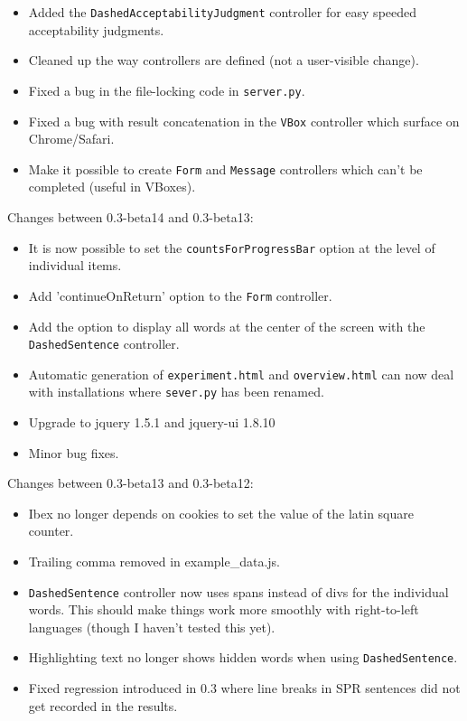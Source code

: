 \documentclass[
]{article}
\providecommand{\tightlist}{%
  \setlength{\itemsep}{0pt}\setlength{\parskip}{0pt}}
\begin{document}
\begin{itemize}
\tightlist
\item
  Added the \texttt{DashedAcceptabilityJudgment} controller for easy
  speeded acceptability judgments.
\item
  Cleaned up the way controllers are defined (not a user-visible
  change).
\item
  Fixed a bug in the file-locking code in \texttt{server.py}.
\item
  Fixed a bug with result concatenation in the \texttt{VBox} controller
  which surface on Chrome/Safari.
\item
  Make it possible to create \texttt{Form} and \texttt{Message}
  controllers which can't be completed (useful in VBoxes).
\end{itemize}

Changes between 0.3-beta14 and 0.3-beta13:

\begin{itemize}
\tightlist
\item
  It is now possible to set the \texttt{countsForProgressBar} option at
  the level of individual items.
\item
  Add 'continueOnReturn' option to the \texttt{Form} controller.
\item
  Add the option to display all words at the center of the screen with
  the \texttt{DashedSentence} controller.
\item
  Automatic generation of \texttt{experiment.html} and
  \texttt{overview.html} can now deal with installations where
  \texttt{sever.py} has been renamed.
\item
  Upgrade to jquery 1.5.1 and jquery-ui 1.8.10
\item
  Minor bug fixes.
\end{itemize}

Changes between 0.3-beta13 and 0.3-beta12:

\begin{itemize}
\tightlist
\item
  Ibex no longer depends on cookies to set the value of the latin square
  counter.
\item
  Trailing comma removed in example\_data.js.
\item
  \texttt{DashedSentence} controller now uses spans instead of divs for
  the individual words. This should make things work more smoothly with
  right-to-left languages (though I haven't tested this yet).
\item
  Highlighting text no longer shows hidden words when using
  \texttt{DashedSentence}.
\item
  Fixed regression introduced in 0.3 where line breaks in SPR sentences
  did not get recorded in the results.
\end{itemize}
\end{document}
